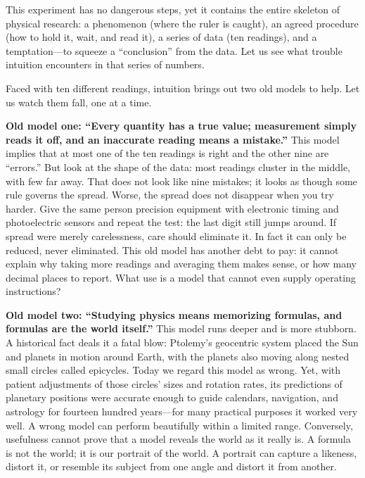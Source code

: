 This experiment has no dangerous steps, yet it contains the entire skeleton of physical research: a phenomenon (where the ruler is caught), an agreed procedure (how to hold it, wait, and read it), a series of data (ten readings), and a temptation---to squeeze a ``conclusion'' from the data. Let us see what trouble intuition encounters in that series of numbers.


Faced with ten different readings, intuition brings out two old models to help. Let us watch them fall, one at a time.

\textbf{Old model one: ``Every quantity has a true value; measurement simply reads it off, and an inaccurate reading means a mistake.''} This model implies that at most one of the ten readings is right and the other nine are ``errors.'' But look at the shape of the data: most readings cluster in the middle, with few far away. That does not look like nine mistakes; it looks as though some rule governs the spread. Worse, the spread does not disappear when you try harder. Give the same person precision equipment with electronic timing and photoelectric sensors and repeat the test: the last digit still jumps around. If spread were merely carelessness, care should eliminate it. In fact it can only be reduced, never eliminated. This old model has another debt to pay: it cannot explain why taking more readings and averaging them makes sense, or how many decimal places to report. What use is a model that cannot even supply operating instructions?

\textbf{Old model two: ``Studying physics means memorizing formulas, and formulas are the world itself.''} This model runs deeper and is more stubborn. A historical fact deals it a fatal blow: Ptolemy's geocentric system placed the Sun and planets in motion around Earth, with the planets also moving along nested small circles called epicycles. Today we regard this model as wrong. Yet, with patient adjustments of those circles' sizes and rotation rates, its predictions of planetary positions were accurate enough to guide calendars, navigation, and astrology for fourteen hundred years---for many practical purposes it worked very well. A wrong model can perform beautifully within a limited range. Conversely, usefulness cannot prove that a model reveals the world as it really is. A formula is not the world; it is our portrait of the world. A portrait can capture a likeness, distort it, or resemble its subject from one angle and distort it from another.

